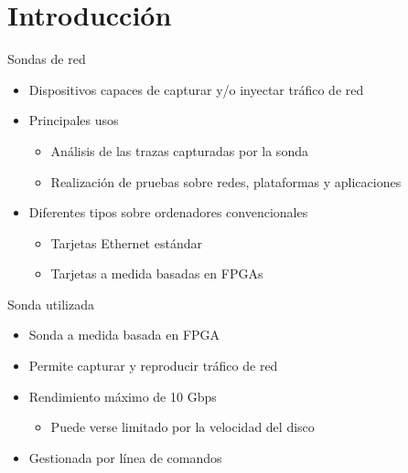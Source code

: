 \section{Introducción}

\begin{frame}{Sondas de red}
  \begin{itemize}
    \item\alert<+>{Dispositivos capaces de capturar y/o inyectar tráfico de red}
    \item\alert<+>{Principales usos}
    \begin{itemize}
      \item Análisis de las trazas capturadas por la sonda
      \item Realización de pruebas sobre redes, plataformas y aplicaciones
    \end{itemize}
    \item\alert<+>{Diferentes tipos sobre ordenadores convencionales}
    \begin{itemize}
      \item Tarjetas Ethernet estándar
      \item Tarjetas a medida basadas en FPGAs
    \end{itemize}
  \end{itemize}
\end{frame}

\begin{frame}{Sonda utilizada}
  \begin{itemize}
    \item\alert<+>{Sonda a medida basada en FPGA}
    \item\alert<+>{Permite capturar y reproducir tráfico de red}
    \item\alert<+>{Rendimiento máximo de 10 Gbps}
    \begin{itemize}
      \item Puede verse limitado por la velocidad del disco
    \end{itemize}
    \item\alert<+>{Gestionada por línea de comandos}
  \end{itemize}
\end{frame}

